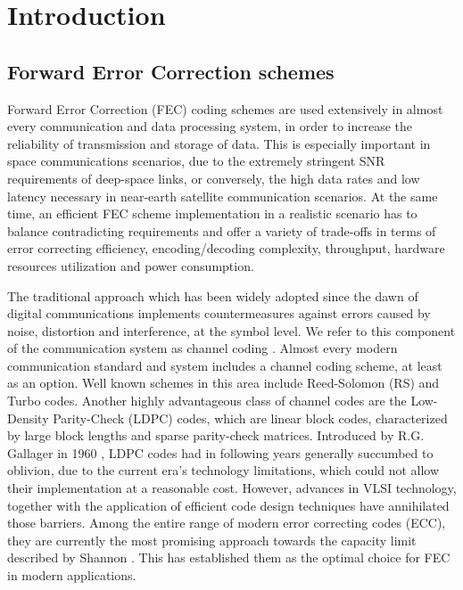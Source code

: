 \section{Introduction}
\label{sec:intro}
\subsection{Forward Error Correction schemes}
Forward Error Correction (FEC) coding schemes are used extensively in almost every communication and data processing system, in order to increase the reliability of transmission and storage of data. This is especially important in space communications scenarios, due to the extremely stringent SNR requirements of deep-space links, or conversely, the high data rates and low latency necessary in near-earth satellite communication scenarios. At the same time, an efficient FEC scheme implementation in a realistic scenario has to balance contradicting requirements and offer a variety of trade-offs in terms of error correcting efficiency, encoding/decoding complexity, throughput, hardware resources utilization and power consumption.\par
The traditional approach which has been widely adopted since the dawn of digital communications implements countermeasures against errors caused by noise, distortion and interference,  at the symbol level. We refer to this component of the communication system as channel coding \cite{Ryan2009}. Almost every modern communication standard and system includes a channel coding scheme, at least as an option. Well known schemes in this area include Reed-Solomon (RS) \cite{Reed1960} and Turbo \cite{Berrou1993} codes. Another highly advantageous class of channel codes are the Low-Density Parity-Check (LDPC) codes, which are linear block codes, characterized by large block lengths and sparse parity-check matrices. Introduced by R.G. Gallager in 1960 \cite{Gallager1962}, LDPC codes had in following years generally succumbed to oblivion, due to the current era’s technology limitations, which could not allow their implementation at a reasonable cost. However, advances in VLSI technology, together with the application of efficient code design techniques have annihilated those barriers. Among the entire range of modern error correcting codes (ECC), they are currently the most promising approach towards the capacity limit described by Shannon \cite{Shannon}. This has established them as the optimal choice for FEC in modern applications.\par

